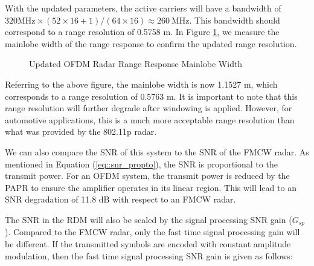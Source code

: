 \documentclass[conference]{IEEEtran}
\begin{document}
With the updated parameters, the active carriers will have a bandwidth of $320 \text{MHz} \times (52 \times 16 + 1)/(64 \times 16) \approx 260\ \text{MHz}$. This bandwidth should correspond to a range resolution of 0.5758 m. In Figure \ref{fig::802_11p_ofdm_improved_range_response_mainlobe_width}, we measure the mainlobe width of the range response to confirm the updated range resolution.


\begin{figure}[H]
\centering
{}
\caption{Updated OFDM Radar Range Response Mainlobe Width}
\label{fig::802_11p_ofdm_improved_range_response_mainlobe_width}
\end{figure}

Referring to the above figure, the mainlobe width is now 1.1527 m, which corresponds to a range resolution of 0.5763 m. It is important to note that this range resolution will further degrade after windowing is applied. However, for automotive applications, this is a much more acceptable range resolution than what was provided by the 802.11p radar.

We can also compare the SNR of this system to the SNR of the FMCW radar. As mentioned in Equation (\ref{eq::snr_propto}), the SNR is proportional to the transmit power. For an OFDM system, the transmit power is reduced by the PAPR to ensure the amplifier operates in its linear region. This will lead to an SNR degradation of 11.8 dB with respect to an FMCW radar.

The SNR in the RDM will also be scaled by the signal processing SNR gain ($G_{sp}$). Compared to the FMCW radar, only the fast time signal processing gain will be different. If the transmitted symbols are encoded with constant amplitude modulation, then the fast time signal processing SNR gain is given as follows:
\end{document}
